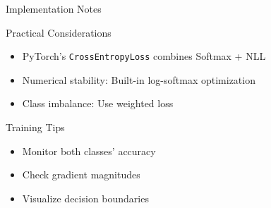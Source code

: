 \documentclass{beamer}
\begin{document}
	\begin{frame}{Implementation Notes}
		\begin{block}{Practical Considerations}
			\begin{itemize}
				\item PyTorch's \texttt{CrossEntropyLoss} combines Softmax + NLL
				\item Numerical stability: Built-in log-softmax optimization
				\item Class imbalance: Use weighted loss
			\end{itemize}
		\end{block}
		
		\begin{exampleblock}{Training Tips}
			\begin{itemize}
				\item Monitor both classes' accuracy
				\item Check gradient magnitudes
				\item Visualize decision boundaries
			\end{itemize}
		\end{exampleblock}
	\end{frame}
	
\end{document}
